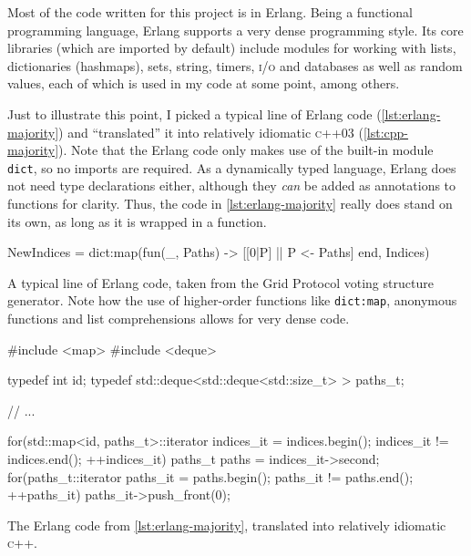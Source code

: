 \documentclass[12pt,chapterprefix=true,toc=bibliography,numbers=noendperiod,
               footnotes=multiple,twoside]{scrreprt}
\begin{document}
Most of the code written for this project is in Erlang. Being a functional programming language, Erlang supports a very dense programming style. Its core libraries (which are imported by default) include modules for working with lists, dictionaries (hashmaps), sets, string, timers, \textsc{i/o} and databases as well as random values, each of which is used in my code at some point, among others.

Just to illustrate this point, I picked a typical line of Erlang code (\cref{lst:erlang-majority}) and \enquote{translated} it into relatively idiomatic \textsc{c}++03 (\cref{lst:cpp-majority}). Note that the Erlang code only makes use of the built-in module \texttt{dict}, so no imports are required. As a dynamically typed language, Erlang does not need type declarations either, although they \emph{can} be added as annotations to functions for clarity. Thus, the code in \cref{lst:erlang-majority} really does stand on its own, as long as it is wrapped in a function.

\begin{listing}[h]
    \begin{erlangcode}
NewIndices = dict:map(fun(_, Paths) -> [[0|P] || P <- Paths] end, Indices)
    \end{erlangcode}
    \caption{A typical line of Erlang code, taken from the Grid Protocol voting structure generator. Note how the use of higher-order functions like \texttt{dict:map}, anonymous functions and list comprehensions allows for very dense code.}
    \label{lst:erlang-majority}
\end{listing}

\begin{listing}[h]
    \begin{cppcode}
#include <map>
#include <deque>

typedef int id;
typedef std::deque<std::deque<std::size_t> > paths_t;

// ...

for(std::map<id, paths_t>::iterator indices_it = indices.begin();
        indices_it != indices.end(); ++indices_it) {
    paths_t paths = indices_it->second;
    for(paths_t::iterator paths_it = paths.begin();
            paths_it != paths.end(); ++paths_it) {
        paths_it->push_front(0);
    }
}
    \end{cppcode}
    \caption{The Erlang code from \cref{lst:erlang-majority}, translated into relatively idiomatic \textsc{c}++.}
    \label{lst:cpp-majority}
\end{listing}
\end{document}
